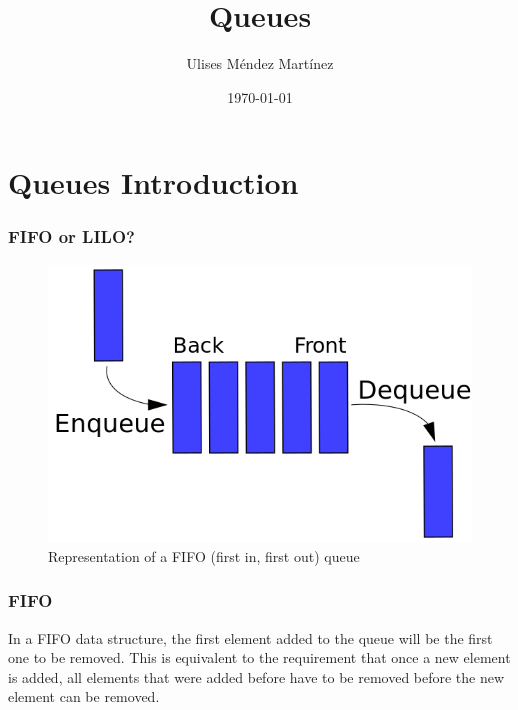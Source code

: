 \documentclass{beamer}
\title[Queues]{Queues} %
\author{Ulises M\'endez Mart\'{i}nez} %
\institute[UTM] %
{
Algorist Weekly Talks \\ %
\medskip
\textit{ulisesmdzmtz@gmail.com} %
}
\date{\today} %
\begin{document}
\begin{frame}
\titlepage %
\end{frame}


\section{Queues Introduction} 

\begin{frame}
\frametitle{ FIFO or LILO?}
\begin{figure}
	\includegraphics[width=0.7\linewidth]{queue.png}
	\caption{Representation of a FIFO (first in, first out) queue}
\end{figure}
\end{frame}

\begin{frame}
\frametitle{ FIFO }
In a FIFO data structure, the first element added to the queue will be the first one to be removed. This is equivalent to the requirement that once a new element is added, all elements that were added before have to be removed before the new element can be removed.
\end{frame} 
\end{document}
